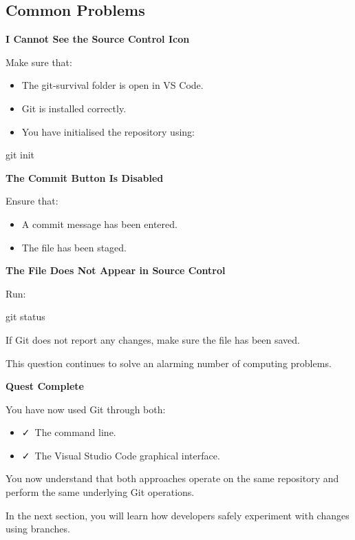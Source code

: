 \documentclass{csc2059practical}
\begin{document}
\subsection{Common Problems}
\begin{commonerror}
\textbf{I Cannot See the Source Control Icon}\par
\medskip

Make sure that:


\end{commonerror}
\begin{itemize}
  \item The git-survival folder is open in VS Code.
  \item Git is installed correctly.
  \item You have initialised the repository using:
\end{itemize}
\begin{terminalplain}
git init
\end{terminalplain}
\begin{commonerror}
\textbf{The Commit Button Is Disabled}\par
\medskip

Ensure that:


\end{commonerror}
\begin{itemize}
  \item A commit message has been entered.
  \item The file has been staged.
\end{itemize}
\begin{commonerror}
\textbf{The File Does Not Appear in Source Control}\par
\medskip

Run:


\end{commonerror}
\begin{terminalplain}
git status
\end{terminalplain}
If Git does not report any changes, make sure the file has been saved.

This question continues to solve an alarming number of computing problems.

\begin{wrapupbox}
\textbf{Quest Complete}\par
\medskip

You have now used Git through both:


\begin{itemize}
  \item \faCheck\ The command line.
\end{itemize}

\begin{itemize}
  \item \faCheck\ The Visual Studio Code graphical interface.
\end{itemize}

You now understand that both approaches operate on the same repository and perform the same underlying Git operations.


In the next section, you will learn how developers safely experiment with changes using branches.


\end{wrapupbox}
\end{document}
